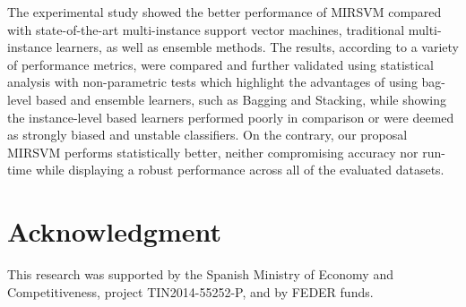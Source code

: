 \documentclass[preprint,12pt]{elsarticle}
\begin{document}
The experimental study showed the better performance of MIRSVM compared with state-of-the-art multi-instance support vector machines, traditional multi-instance learners, as well as ensemble methods. The results, according to a variety of performance metrics, were compared and further validated using statistical analysis with non-parametric tests which highlight the advantages of using bag-level based and ensemble learners, such as Bagging and Stacking, while showing the instance-level based learners performed poorly in comparison or were deemed as strongly biased and unstable classifiers. On the contrary, our proposal MIRSVM performs statistically better, neither compromising accuracy nor run-time while displaying a robust performance across all of the evaluated datasets.

\section*{Acknowledgment}
This research was supported by the Spanish Ministry of Economy and Competitiveness, project TIN2014-55252-P, and by FEDER funds.


   
\end{document}
